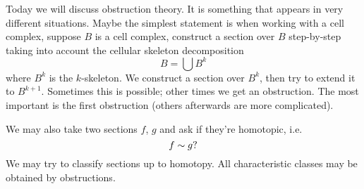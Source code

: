 Today we will discuss obstruction theory. It is something that
appears in very different situations. Maybe the simplest
statement is when working with a cell complex, suppose $B$ is a
cell complex, construct a section over $B$ step-by-step taking
into account the cellular skeleton
decomposition
\begin{equation}
B=\bigcup B^{k}
\end{equation}
where $B^{k}$ is the $k$-skeleton. We construct a section over
$B^{k}$, then try to extend it to $B^{k+1}$. Sometimes this is
possible; other times we get an obstruction. The most important
is the first obstruction (others afterwards are more complicated).

We may also take two sections $f$, $g$ and ask if they're
homotopic, i.e.
\begin{equation}
f\sim g?
\end{equation}
We may try to classify sections up to
homotopy. All
characteristic classes may be obtained by obstructions.


